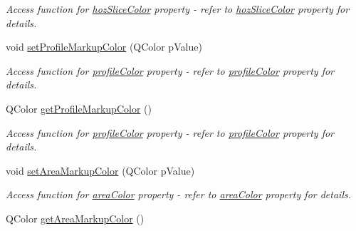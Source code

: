 \begin{DoxyCompactItemize}
\begin{DoxyCompactList}\small\item\em Access function for \hyperlink{classQEImage_a9e69a916b1c656c1be7bc07727294756}{hozSliceColor} property -\/ refer to \hyperlink{classQEImage_a9e69a916b1c656c1be7bc07727294756}{hozSliceColor} property for details. \end{DoxyCompactList}\item 
\hypertarget{classQEImage_ad30841ade6013ce8144e425d64d5a7f4}{
void \hyperlink{classQEImage_ad30841ade6013ce8144e425d64d5a7f4}{setProfileMarkupColor} (QColor pValue)}
\label{classQEImage_ad30841ade6013ce8144e425d64d5a7f4}

\begin{DoxyCompactList}\small\item\em Access function for \hyperlink{classQEImage_a51e836fac19a11f9199791c40e27b850}{profileColor} property -\/ refer to \hyperlink{classQEImage_a51e836fac19a11f9199791c40e27b850}{profileColor} property for details. \end{DoxyCompactList}\item 
\hypertarget{classQEImage_a3fbafd4680c8170ac79337539f7bb82f}{
QColor \hyperlink{classQEImage_a3fbafd4680c8170ac79337539f7bb82f}{getProfileMarkupColor} ()}
\label{classQEImage_a3fbafd4680c8170ac79337539f7bb82f}

\begin{DoxyCompactList}\small\item\em Access function for \hyperlink{classQEImage_a51e836fac19a11f9199791c40e27b850}{profileColor} property -\/ refer to \hyperlink{classQEImage_a51e836fac19a11f9199791c40e27b850}{profileColor} property for details. \end{DoxyCompactList}\item 
\hypertarget{classQEImage_a4bef048d579ae37a2de5bb59a029af42}{
void \hyperlink{classQEImage_a4bef048d579ae37a2de5bb59a029af42}{setAreaMarkupColor} (QColor pValue)}
\label{classQEImage_a4bef048d579ae37a2de5bb59a029af42}

\begin{DoxyCompactList}\small\item\em Access function for \hyperlink{classQEImage_ad44e666dbc8ceadc207a25494be80762}{areaColor} property -\/ refer to \hyperlink{classQEImage_ad44e666dbc8ceadc207a25494be80762}{areaColor} property for details. \end{DoxyCompactList}\item 
\hypertarget{classQEImage_afce46c00af65dcb2f2550ac15fe85f90}{
QColor \hyperlink{classQEImage_afce46c00af65dcb2f2550ac15fe85f90}{getAreaMarkupColor} ()}
\label{classQEImage_afce46c00af65dcb2f2550ac15fe85f90}


\end{DoxyCompactItemize}
